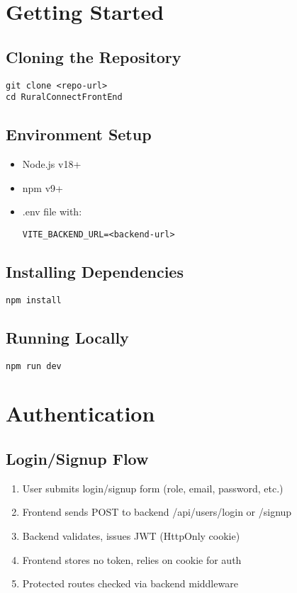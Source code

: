 \documentclass{article}
\begin{document}
\section{Getting Started}
\subsection{Cloning the Repository}
\begin{verbatim}
git clone <repo-url>
cd RuralConnectFrontEnd
\end{verbatim}

\subsection{Environment Setup}
\begin{itemize}
  \item Node.js v18+
  \item npm v9+
  \item .env file with:
  \begin{verbatim}
VITE_BACKEND_URL=<backend-url>
  \end{verbatim}
\end{itemize}

\subsection{Installing Dependencies}
\begin{verbatim}
npm install
\end{verbatim}

\subsection{Running Locally}
\begin{verbatim}
npm run dev
\end{verbatim}

\section{Authentication}
\subsection{Login/Signup Flow}
\begin{enumerate}
  \item User submits login/signup form (role, email, password, etc.)
  \item Frontend sends POST to backend /api/users/login or /signup
  \item Backend validates, issues JWT (HttpOnly cookie)
  \item Frontend stores no token, relies on cookie for auth
  \item Protected routes checked via backend middleware
\end{enumerate}
\end{document}
